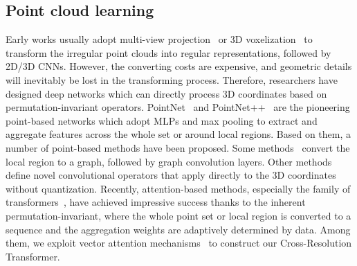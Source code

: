 \documentclass[letterpaper]{article} %
\begin{document}
\subsection{Point cloud learning}
Early works usually adopt multi-view projection~\cite{li2016vehicle,chen2017multi,lang2019pointpillars} 
or 3D voxelization~\cite{maturana2015voxnet,song2017semantic,riegler2017octnet,choy20194d} to transform the irregular point clouds into regular representations, followed by 2D/3D CNNs. 
However, the converting costs are expensive, and geometric details will inevitably be lost in the transforming process.
Therefore, researchers have designed deep networks which can directly process 3D coordinates based on permutation-invariant operators. 
PointNet~\cite{qi2017pointnet} and PointNet++~\cite{qi2017pointnet++} are the pioneering point-based networks which adopt MLPs and max pooling to extract and aggregate features across the whole set or around local regions. 
Based on them, a number of point-based methods have been proposed. 
Some methods~\cite{wang2019dynamic, zhao2019pointweb,simonovsky2017dynamic} convert the local region to a graph, followed by graph convolution layers.
Other methods~\cite{xu2018spidercnn, wu2019pointconv,thomas2019kpconv} define novel convolutional operators that apply directly to the 3D coordinates without quantization. 
Recently, attention-based methods, especially the family of transformers~\cite{vaswani2017attention, zhao2021point, guo2021pct,park2022fast}, have achieved impressive success thanks to the inherent permutation-invariant, where the whole point set or local region is converted to a sequence and the aggregation weights are adaptively 
determined by data.
Among them, we exploit vector attention mechanisms~\cite{zhao2021point} to construct our Cross-Resolution Transformer.
\end{document}
